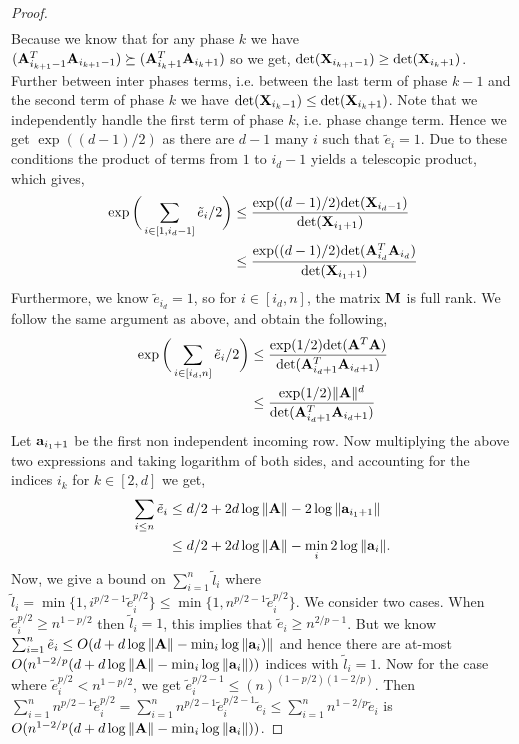 \begin{proof}{\label{proof:onlineSummationBound}}
\begin{align*}
 \end{align*}
 Because we know that for any phase $k$ we have $(\mathbf{A}_{i_{k+1}-1}^T \mathbf{A}_{i_{k+1}-1}) \succeq (\mathbf{A}_{i_k+1}^T \mathbf{A}_{i_k+1})$ so we get,
 $\mbox{det}(\mathbf{X}_{i_{k+1}-1}) \ge \mbox{det}(\mathbf{X}_{i_k+1})$. Further between inter phases terms, i.e. between the last term of phase $k-1$ and the second term of phase $k$ we have $\mbox{det}(\mathbf{X}_{i_k-1}) \leq \mbox{det}(\mathbf{X}_{i_k+1})$. Note that we independently handle the first term of phase $k$, i.e. phase change term. Hence we get $\exp((d-1)/2)$ as there are $d-1$ many $i$ such that $\tilde{e}_{i} =1$. Due to these conditions the product of terms from $1$ to $i_{d}-1$ yields a telescopic product, which gives,
 \begin{align*}
   \exp\bigg(\sum_{i\in [1, i_{d}-1]} \tilde{e}_{i}/2\bigg) & \le \frac{\exp((d-1)/2)\mbox{det}(\mathbf{X}_{i_{d}-1})}{\mbox{det}(\mathbf{X}_{i_1+1})} \\
   & \le \frac{\exp((d-1)/2)\mbox{det}(\mathbf{A}_{i_d}^T \mathbf{A}_{i_d})}{\mbox{det}(\mathbf{X}_{i_1+1})}
 \end{align*}
 Furthermore, we know $\tilde{e}_{i_d}=1$, so for $i\in [i_d, n]$, the matrix $\mathbf{M}$ is full rank. We follow the same argument as above, and obtain the following,
 \begin{align*}
  \exp\bigg(\sum_{i\in [i_d, n]} \tilde{e}_{i}/2\bigg) & \le \frac{\exp(1/2)\mbox{det}(\mathbf{A}^T \mathbf{A})}{\mbox{det}(\mathbf{A}_{i_d+1}^T \mathbf{A}_{i_d+1})} \\
  & \le \frac{\exp(1/2)\|\mathbf{A}\|^d}{\mbox{det}(\mathbf{A}_{i_d+1}^T \mathbf{A}_{i_d+1})} 
 \end{align*}
Let $\mathbf{a}_{i_1+1}$ be the first non independent incoming row. Now multiplying the above two expressions and taking logarithm of both sides, and accounting for the indices $i_k$ for $k\in[2,d]$ we get,
\begin{align*}
    \sum_{i\le n} \tilde{e}_i & \le d/2 + 2 d\log\|\mathbf{A}\| - 2\log \|\mathbf{a}_{i_1+1}\|  \\
    & \le d/2 + 2 d\log\|\mathbf{A}\| - \min_{i}2\log \|\mathbf{a}_{i}\|. 
\end{align*}
Now, we give a bound on $\sum_{i=1}^{n} \tilde{l}_{i}$ where $\tilde{l}_{i} = \min\{1,i^{p/2-1}\tilde{e}_{i}^{p/2}\} \leq \min\{1,n^{p/2-1}\tilde{e}_{i}^{p/2}\}$. We consider two cases. When $\tilde{e}_i^{p/2} \geq n^{1-p/2}$ then $\tilde{l}_{i} = 1$, this implies that $\tilde{e}_i \geq n^{2/p-1}$. But we know $\sum_{i=1}^{n} \tilde{e}_i 
\le O(d+d\log\|\mathbf{A}\|-\min_{i}\log \|\mathbf{a}_{i})\|$ and hence there are at-most $O(n^{1-2/p}(d+d\log\|\mathbf{A}\|-\min_{i}\log \|\mathbf{a}_{i}\|))$ indices with $\tilde{l}_{i} = 1$. Now for the case where $\tilde{e}_{i}^{p/2} < n^{1-p/2}$, we get $\tilde{e}_{i}^{p/2-1} \leq (n)^{(1-p/2)(1-2/p)}$. Then $\sum_{i=1}^{n} n^{p/2-1}\tilde{e}_{i}^{p/2} = \sum_{i=1}^{n} n^{p/2-1}\tilde{e}_{i}^{p/2-1} \tilde{e}_{i} \leq \sum_{i=1}^{n}n^{1-2/p}\tilde{e}_{i}$ is $O(n^{1-2/p}(d+d\log\|\mathbf{A}\|-\min_{i}\log \|\mathbf{a}_{i}\|))$.
\end{proof}
